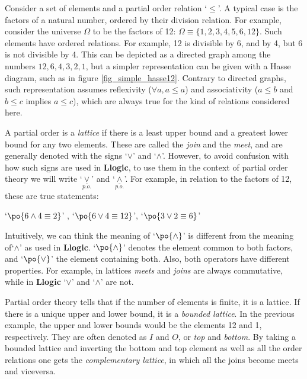 \documentclass[
		twoside,openright,titlepage,numbers=noenddot,manychapters,
		headinclude,%
                footinclude=false,cleardoublepage=empty,
                BCOR=5mm,
		fontsize=11pt, %
                 enabledeprecatedfontcommands]{scrreprt}
\begin{document}
Consider a set of elements and a partial order relation `$\leq$'. A typical case is the factors of a natural number, ordered by their division relation. For example, consider the universe $\Omega$ to be the factors of 12: $\Omega \equiv \{ 1,2,3,4,5,6,12 \}$. Such elements have ordered relations. For example, 12 is divisible by 6, and by 4, but 6 is not divisible by 4. This can be depicted as a directed graph among the numbers $12, 6, 4, 3, 2, 1$, but a simpler representation can be given with a Hasse diagram, such as in figure \ref{fig_simple_hasse12}. Contrary to directed graphs, such representation assumes reflexivity ($ \forall a, a \leq a$) and associativity ($a \leq b$ and $b \leq c $ implies $a \leq c$), which are always true for the kind of relations considered here.



A partial order is a \emph{lattice} if there is a least upper bound and a greatest lower bound for any two elements. These are called the \emph{join} and the \emph{meet}, and are generally denoted with the signs `$\vee$' and `$\wedge$'. However, to avoid confusion with how such signs are used in \textbf{Llogic}, to use them in the context of partial order theory we will write  `$\underset{p.o.}{\underline{  \ \pmb{\vee} \  }}$' and 
 `$\underset{p.o.}{\underline{ \ \pmb{\wedge} \  }}$'. For example, in relation to the factors of 12, these are true statements:  
\begin{center}
`$\po{ 6 \wedge 4 \equiv 2 }$'  ,  `$\po{6 \vee 4 \equiv 12 }$',  `$\po{3 \vee 2 \equiv 6}$'
\end{center}
Intuitively, we can think the meaning of `$\po{\wedge}$' is different from the meaning of`$\wedge$' as used in \textbf{Llogic}. `$\po{\wedge}$' denotes the element common to both factors, and `$\po{\vee}$' the element containing both. Also, both operators have different properties. For example, in lattices \emph{meets} and \emph{joins} are always commutative, while in \textbf{Llogic}  `$\vee$' and `$\wedge$' are not.

 Partial order theory tells that if the number of elements is finite, it is  a lattice. If there is a unique upper and lower bound, it is a \emph{bounded lattice}. In the previous example, the upper and lower bounds would be the elements 12 and 1, respectively. They are often denoted as $I$ and $O$, or \emph{top} and \emph{bottom}. By taking a bounded lattice and inverting the bottom and top element as well as all the order relations one gets the \emph{complementary lattice}, in which all the joins become meets and viceversa.
\end{document}
